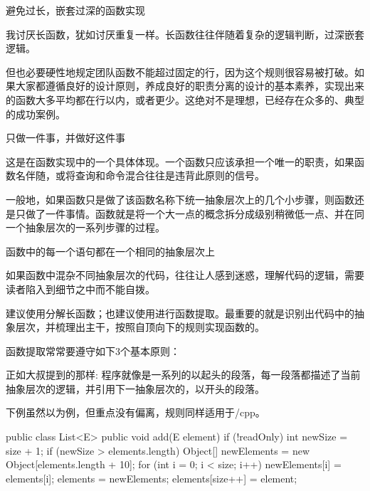 \begin{content}

\begin{regulation}
避免过长，嵌套过深的函数实现
\end{regulation}

我讨厌长函数，犹如讨厌重复一样。长函数往往伴随着复杂的逻辑判断，过深嵌套逻辑。

但也必要硬性地规定团队函数不能超过固定的行，因为这个规则很容易被打破。如果大家都遵循良好的设计原则，养成良好的职责分离的设计的基本素养，实现出来的函数大多平均都在行以内，或者更少。这绝对不是理想，已经存在众多的、典型的成功案例。

\begin{regulation}
只做一件事，并做好这件事
\end{regulation}

这是在函数实现中的一个具体体现。一个函数只应该承担一个唯一的职责，如果函数名伴随，或将查询和命令混合往往是违背此原则的信号。

一般地，如果函数只是做了该函数名称下统一抽象层次上的几个小步骤，则函数还是只做了一件事情。函数就是将一个大一点的概念拆分成级别稍微低一点、并在同一个抽象层次的一系列步骤的过程。

\begin{regulation}
函数中的每一个语句都在一个相同的抽象层次上
\end{regulation}

如果函数中混杂不同抽象层次的代码，往往让人感到迷惑，理解代码的逻辑，需要读者陷入到细节之中而不能自拨。

建议使用分解长函数；也建议使用进行函数提取。最重要的就是识别出代码中的抽象层次，并梳理出主干，按照自顶向下的规则实现函数的。

函数提取常常要遵守如下3个基本原则：
\begin{enum}
\end{enum}

正如大叔提到的那样: 程序就像是一系列的以起头的段落，每一段落都描述了当前抽象层次的逻辑，并引用下一抽象层次的，以开头的段落。

下例虽然以为例，但重点没有偏离，规则同样适用于\clang{}/cpp{}。

\begin{leftbar}
\begin{java}[caption={java.util.List}]
public class List<E> {
   public void add(E element) {
      if (!readOnly) {
         int newSize = size + 1;
         if (newSize > elements.length) {
            Object[] newElements =
               new Object[elements.length + 10];
            for (int i = 0; i < size; i++)
               newElements[i] = elements[i];
            elements = newElements;
         }
         elements[size++] = element;
      }
   }
}
\end{java}
\end{leftbar}


\end{content}

